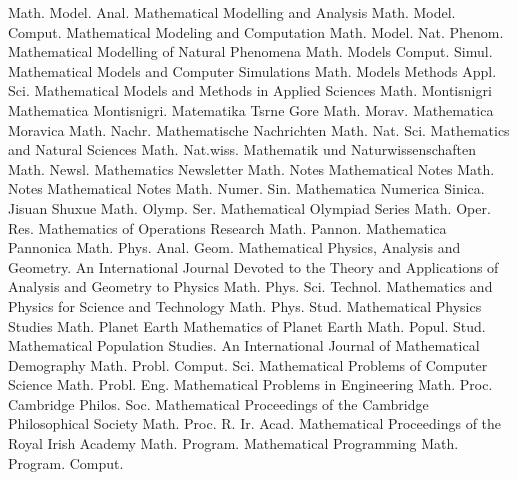 {Math. Model. Anal.}
{Mathematical Modelling and Analysis}
{Math. Model. Comput.}
{Mathematical Modeling and Computation}
{Math. Model. Nat. Phenom.}
{Mathematical Modelling of Natural Phenomena}
{Math. Models Comput. Simul.}
{Mathematical Models and Computer Simulations}
{Math. Models Methods Appl. Sci.}
{Mathematical Models and Methods in Applied Sciences}
{Math. Montisnigri}
{Mathematica Montisnigri. Matematika Tsrne Gore}
{Math. Morav.}
{Mathematica Moravica}
{Math. Nachr.}
{Mathematische Nachrichten}
{Math. Nat. Sci.}
{Mathematics and Natural Sciences}
{Math. Nat.wiss.}
{Mathematik und Naturwissenschaften}
{Math. Newsl.}
{Mathematics Newsletter}
{Math. Notes}
{Mathematical Notes}
{Math. Notes}
{Mathematical Notes}
{Math. Numer. Sin.}
{Mathematica Numerica Sinica. Jisuan Shuxue}
{Math. Olymp. Ser.}
{Mathematical Olympiad Series}
{Math. Oper. Res.}
{Mathematics of Operations Research}
{Math. Pannon.}
{Mathematica Pannonica}
{Math. Phys. Anal. Geom.}
{Mathematical Physics, Analysis and Geometry. An International Journal Devoted to the Theory and Applications of Analysis and Geometry to Physics}
{Math. Phys. Sci. Technol.}
{Mathematics and Physics for Science and Technology}
{Math. Phys. Stud.}
{Mathematical Physics Studies}
{Math. Planet Earth}
{Mathematics of Planet Earth}
{Math. Popul. Stud.}
{Mathematical Population Studies. An International Journal of Mathematical Demography}
{Math. Probl. Comput. Sci.}
{Mathematical Problems of Computer Science}
{Math. Probl. Eng.}
{Mathematical Problems in Engineering}
{Math. Proc. Cambridge Philos. Soc.}
{Mathematical Proceedings of the Cambridge Philosophical Society}
{Math. Proc. R. Ir. Acad.}
{Mathematical Proceedings of the Royal Irish Academy}
{Math. Program.}
{Mathematical Programming}
{Math. Program. Comput.}
